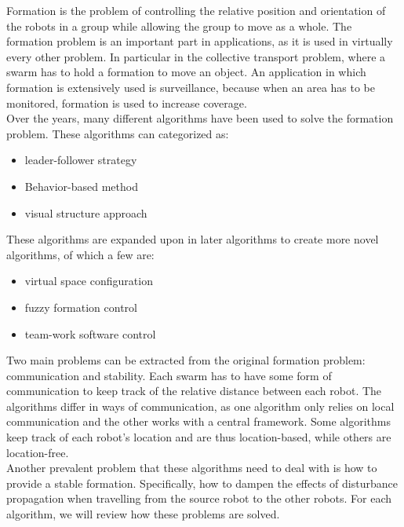 
Formation is the problem of controlling the relative position and orientation of the robots in a group while allowing the group to move as a whole. \cite{consolini}
The formation problem is an important part in applications, as it is used in virtually every other problem. 
In particular in the collective transport problem, where a swarm has to hold a formation to move an object. 
An application in which formation is extensively used is surveillance, because when an area has to be monitored, formation is used to increase coverage. \cite{burkle2011} \\

Over the years, many different algorithms have been used to solve the formation problem. \cite{chen2005} \cite{consolini}
These algorithms can categorized as:

\begin{itemize}
	\item leader-follower strategy \cite{consolini2007} \cite{Das}
	\item Behavior-based method \cite{balch1998} \cite{lawton}
	\item visual structure approach \cite{ren} \cite{Do}
\end{itemize}

These algorithms are expanded upon in later algorithms to create more novel algorithms, of which a few are:

\begin{itemize}
	\item virtual space configuration \cite{Wee}
	\item fuzzy formation control \cite{Ranjbar-Sahraei}
	\item team-work software control \cite{Kaminka}
\end{itemize}

Two main problems can be extracted from the original formation problem: communication and stability. 
Each swarm has to have some form of communication to keep track of the relative distance between each robot. 
The algorithms differ in ways of communication, as one algorithm only relies on local communication and the other works with a central framework.
Some algorithms keep track of each robot's location and are thus location-based, while others are location-free. \\

Another prevalent problem that these algorithms need to deal with is how to provide a stable formation. 
Specifically, how to dampen the effects of disturbance propagation when travelling from the source robot to the other robots. 
For each algorithm, we will review how these problems are solved. \\

